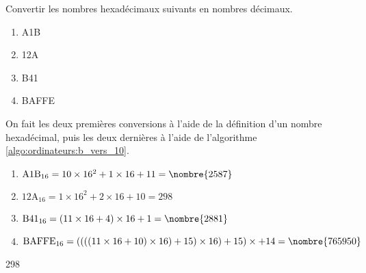 \begin{exercice}
  Convertir les nombres hexadécimaux suivants en nombres décimaux.
  \begin{enumerate}
  \item A1B
  \item 12A
  \item B41
  \item BAFFE
  \end{enumerate}
  \begin{sol}
    On fait les deux premières conversions à l'aide de la définition
    d'un nombre hexadécimal, puis les deux dernières à l'aide de
    l'algorithme \ref{algo:ordinateurs:b_vers_10}.
    \begin{enumerate}
    \item $\text{A1B}_{16} = 10 \times 16^2 + 1 \times 16 + 11 = \nombre{2587}$
    \item $\text{12A}_{16} = 1 \times 16^2 + 2 \times 16 + 10 = 298$
    \item $\text{B41}_{16} = (11 \times 16 + 4) \times 16 + 1 = \nombre{2881}$
    \item $\text{BAFFE}_{16} = ((((11 \times 16 + 10) \times 16) + 15)
      \times 16) + 15) \times  + 14 = \nombre{765950}$
    \end{enumerate}
  \end{sol}
  \begin{rep}
    \begin{inparaenum}
    \item {}
    \item 298
    \item {}
    \item {}
    \end{inparaenum}
  \end{rep}
\end{exercice}

